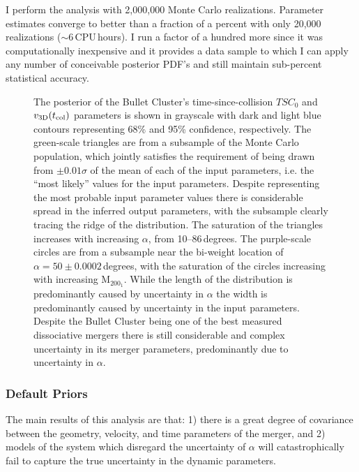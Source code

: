 I perform the analysis with 2,000,000 Monte Carlo realizations.  
Parameter estimates converge to better than a fraction of a percent with only 20,000 realizations ($\sim6$\,CPU\,hours).
I run a factor of a hundred more since it was computationally inexpensive and it provides a data sample to which I can apply any number of conceivable posterior PDF's and still maintain sub-percent statistical accuracy.

\begin{figure}
\caption{
The posterior of the Bullet Cluster's time-since-collision $TSC_0$ and $v_{\rm 3D}(t_{\rm col})$ parameters is shown in grayscale with dark and light blue contours representing 68\% and 95\% confidence, respectively.
The green-scale triangles are from a subsample of the Monte Carlo population, which jointly satisfies the requirement of being drawn from $\pm 0.01 \sigma$ of the mean of each of the input parameters, i.e. the ``most likely'' values for the input parameters. 
Despite representing the most probable input parameter values there is considerable spread in the inferred output parameters, with the subsample clearly tracing the ridge of the distribution. 
The saturation of the triangles increases with increasing $\alpha$, from 10--86\,degrees.
The purple-scale circles are from a subsample near the bi-weight location of $\alpha=50\pm0.0002$\,degrees, with the saturation of the circles increasing with increasing M$_{200_1}$.
While the length of the distribution is predominantly caused by uncertainty in $\alpha$ the width is predominantly caused by uncertainty in the input parameters.
Despite the Bullet Cluster being one of the best measured dissociative mergers there is still considerable and complex uncertainty in its merger parameters, predominantly due to uncertainty in $\alpha$. 
\label{fig_bcTSC}}
\end{figure}


\subsubsection{Default Priors}\label{sec_defaultprior}

The main results of this analysis are that: 1) there is a great degree of covariance between the geometry, velocity, and time parameters of the merger, and 2) models of the system which disregard the uncertainty of $\alpha$ will catastrophically fail to capture the true uncertainty in the dynamic parameters.

